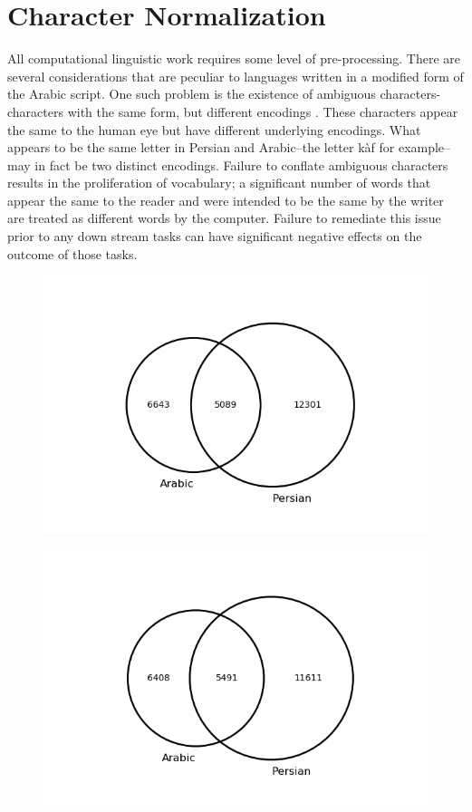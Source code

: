\documentclass[12pt, oneside]{report}
\begin{document}
\section{Character Normalization}
\par
All computational linguistic work requires some level of pre-processing. There are several considerations that are peculiar to languages written in a modified form of the Arabic script. One such problem is the existence of ambiguous characters-characters with the same form, but different encodings \cite{jaf_semi-automatic_2016}. These characters appear the same to the human eye but have different underlying encodings. What appears to be the same letter in Persian and Arabic–the letter k\`{a}f for example–may in fact be two distinct encodings. Failure to conflate ambiguous characters results in the proliferation of vocabulary; a significant number of words that appear the same to the reader and were intended to be the same by the writer are treated as different words by the computer. Failure to remediate this issue prior to any down stream tasks can have significant negative effects on the outcome of those tasks. \begin{figure}
	\begin{minipage}{\linewidth}
		\centering\captionsetup[subfigure]{justification=centering}
		\includegraphics[width=\linewidth]{figures/venn-proc-one-freq5.png}
		\subcaption{}
		\label{fig:char-norm-a}\par\vfill
		\includegraphics[width=\linewidth]{figures/venn-proc-two-freq5.png}

\end{minipage}
\end{figure}
\end{document}
